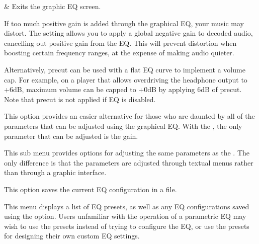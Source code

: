 \begin {description}
\begin{btnmap}
          &
      Exits the graphic EQ screen.
          \\
    \end{btnmap}

  \item[Pre-cut.]
  If too much positive gain is added through the graphical EQ, your music may
  distort.  The  setting allows you to apply a global negative
  gain to decoded audio, cancelling out positive gain from the EQ.  This will
  prevent distortion when boosting certain frequency ranges, at the expense of
  making audio quieter.

  Alternatively, precut can be used with a flat EQ curve to implement a volume
  cap.  For example, on a player that allows overdriving the headphone output
  to +6dB, maximum volume can be capped to +0dB by applying 6dB of precut. Note
  that precut is not applied if EQ is disabled.

\item[Simple EQ.]
This option provides an easier alternative for those who are daunted by all of
the parameters that can be adjusted using the graphical EQ. With the
, the only parameter that can be adjusted is the gain.

\item[Advanced EQ.]
This sub menu provides options for adjusting the same parameters as the
. The only difference is that the parameters are
adjusted through textual menus rather than through a graphic interface.

\item[Save EQ Preset.]
This option saves the current EQ configuration in a  file.

\item[Browse EQ Presets.]
This menu displays a list of EQ presets, as well as any EQ configurations saved
using the  option. Users unfamiliar with the
operation of a parametric EQ may wish to use the presets instead of trying to
configure the EQ, or use the presets for designing their own custom EQ
settings.

\end{description}

